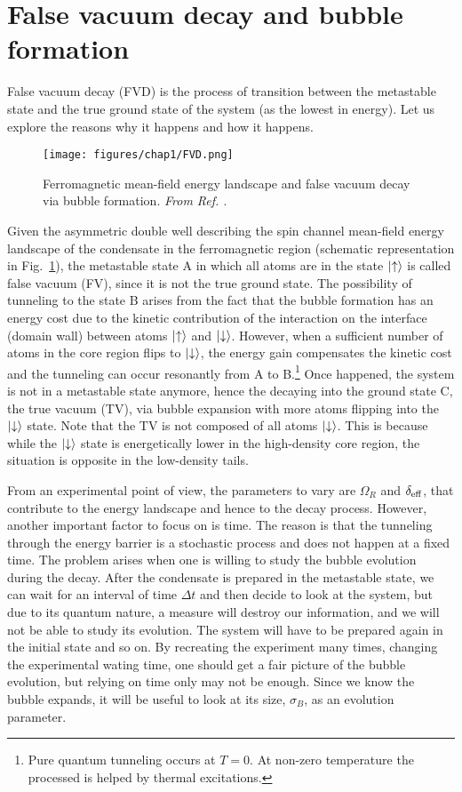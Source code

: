 \section{False vacuum decay and bubble formation}
False vacuum decay (FVD) is the process of transition between the metastable state and the true ground state of the system (as the lowest in energy). Let us explore the reasons why it happens and how it happens.

\begin{figure}[h!]
    \centering
    \texttt{[image: figures/chap1/FVD.png]}
    \caption{Ferromagnetic mean-field energy landscape and false vacuum decay via bubble formation. \textit{From Ref. \cite{zenesini2024false}}.}
    \label{fig:FVD}
\end{figure}

Given the asymmetric double well describing the spin channel mean-field energy landscape of the condensate in the ferromagnetic region (schematic representation in Fig.\ \ref{fig:FVD}), the metastable state A in which all atoms are in the state $\ket{\uparrow}$ is called false vacuum (FV), since it is not the true ground state.
The possibility of tunneling to the state B arises from the fact that the bubble formation has an energy cost due to the kinetic contribution of the interaction on the interface (domain wall) between atoms $\ket{\uparrow}$ and $\ket{\downarrow}$. However, when a sufficient number of atoms in the core region flips to $\ket{\downarrow}$, the energy gain compensates the kinetic cost and the tunneling can occur resonantly from A to B.\footnote{Pure quantum tunneling occurs at $T = 0$. At non-zero temperature the processed is helped by thermal excitations.} Once happened, the system is not in a metastable state anymore, hence the decaying into the ground state C, the true vacuum (TV), via bubble expansion with more atoms flipping into the $\ket{\downarrow}$ state. Note that the TV is not composed of all atoms $\ket{\downarrow}$. This is because while the $\ket{\downarrow}$ state is energetically lower in the high-density core region, the situation is opposite in the low-density tails.

From an experimental point of view, the parameters to vary are $\Omega_R$ and $\delta_{\rm eff}$, that contribute to the energy landscape and hence to the decay process. However, another important factor to focus on is time. The reason is that the tunneling through the energy barrier is a stochastic process and does not happen at a fixed time. The problem arises when one is willing to study the bubble evolution during the decay. After the condensate is prepared in the metastable state, we can wait for an interval of time $\Delta t$ and then decide to look at the system, but due to its quantum nature, a measure will destroy our information, and we will not be able to study its evolution. The system will have to be prepared again in the initial state and so on. By recreating the experiment many times, changing the experimental wating time, one should get a fair picture of the bubble evolution, but relying on time only may not be enough. Since we know the bubble expands, it will be useful to look at its size, $\sigma_B$, as an evolution parameter.



